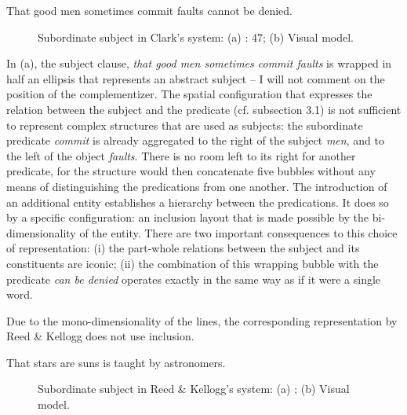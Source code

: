 \documentclass[output=paper]{langsci/langscibook}
\begin{document}
\ea \label{ex:4:4} That good men sometimes commit faults cannot be denied. \z

\begin{figure}
    \caption{Subordinate subject in Clark’s system: (a) \citeyear{clark_normal_1870}: 47; (b) Visual model.\label{fig:4:9}}
\end{figure}
 

In (a), the subject clause, \textit{that good men sometimes commit faults} is wrapped in half an ellipsis that represents an abstract subject – I will not comment on the position of the complementizer. The spatial configuration that expresses the relation between the subject and the predicate (cf. subsection 3.1) is not sufficient to represent complex structures that are used as subjects: the subordinate predicate \textit{commit} is already aggregated to the right of the subject \textit{men}, and to the left of the object \textit{faults}. There is no room left to its right for another predicate, for the structure would then concatenate five bubbles without any means of distinguishing the predications from one another. The introduction of an additional entity establishes a hierarchy between the predications. It does so by a specific configuration: an inclusion layout that is made possible by the bi-dimensionality of the entity. There are two important consequences to this choice of representation: (i) the part-whole relations between the subject and its constituents are iconic; (ii) the combination of this wrapping bubble with the predicate \textit{can be denied} operates exactly in the same way as if it were a single word.

Due to the mono-dimensionality of the lines, the corresponding representation by Reed \& Kellogg does not use inclusion.

\ea \label{ex:4:5} That stars are suns is taught by astronomers. \z


\begin{figure}
    \caption{Subordinate subject in Reed \& Kellogg’s system: (a) \citeyear[137]{reed_graded_1879}; (b) Visual model.\label{fig:4:10}}
\end{figure}
\end{document}
